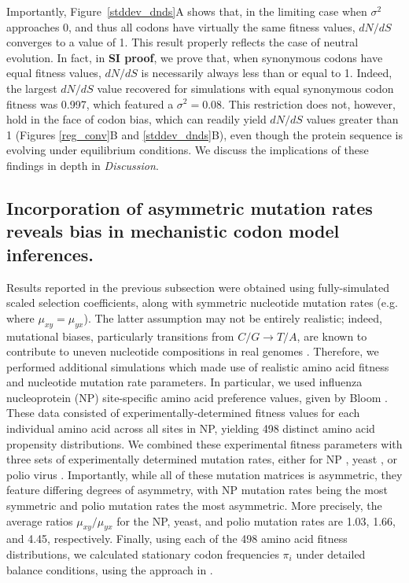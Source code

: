 \documentclass{pnastwo}
\begin{document}
Importantly, Figure~\ref{stddev_dnds}A shows that, in the limiting case when $\sigma^2$ approaches 0, and thus all codons have virtually the same fitness values, $dN/dS$ converges to a value of 1. This result properly reflects the case of neutral evolution. In fact, in \textbf{SI proof}, we prove that, when synonymous codons have equal fitness values, $dN/dS$ is necessarily always less than or equal to 1. Indeed, the largest $dN/dS$ value recovered for simulations with equal synonymous codon fitness was 0.997, which featured a $\sigma^2 = 0.08$. This restriction does not, however, hold in the face of codon bias, which can readily yield $dN/dS$ values greater than 1 (Figures \ref{reg_conv}B and \ref{stddev_dnds}B), even though the protein sequence is evolving under equilibrium conditions. We discuss the implications of these findings in depth in \textit{Discussion}.


\subsection*{Incorporation of asymmetric mutation rates reveals bias in mechanistic codon model inferences.}

Results reported in the previous subsection were obtained using fully-simulated scaled selection coefficients, along with symmetric nucleotide mutation rates (e.g. where $\mu_{xy} = \mu_{yx}$). The latter assumption may not be entirely realistic; indeed, mutational biases, particularly transitions from $C/G \rightarrow T/A$, are known to contribute to uneven nucleotide compositions in real genomes \cite{Hernandez2007,HershbergPetrov2010,Zhu2014,Acevedo2014}. Therefore, we performed additional simulations which made use of realistic amino acid fitness and nucleotide mutation rate parameters. In particular, we used influenza nucleoprotein (NP) site-specific amino acid preference values, given by Bloom \cite{Bloom2014a}. These data consisted of experimentally-determined fitness values for each individual amino acid across all sites in NP, yielding 498 distinct amino acid propensity distributions. We combined these experimental fitness parameters with three sets of experimentally determined mutation rates, either for NP \cite{Bloom2014a}, yeast \cite{Zhu2014}, or polio virus \cite{Acevedo2014}. Importantly, while all of these mutation matrices is asymmetric, they feature differing degrees of asymmetry, with NP mutation rates being the most symmetric and polio mutation rates the most asymmetric. More precisely, the average ratios $\mu_{xy}/\mu_{yx}$ for the NP, yeast, and polio mutation rates are 1.03, 1.66, and 4.45, respectively. Finally, using each of the 498 amino acid fitness distributions, we calculated stationary codon frequencies $\pi_i$ under detailed balance conditions, using the approach in \cite{Bloom2014a,Bloom2014b}. 
\end{document}
